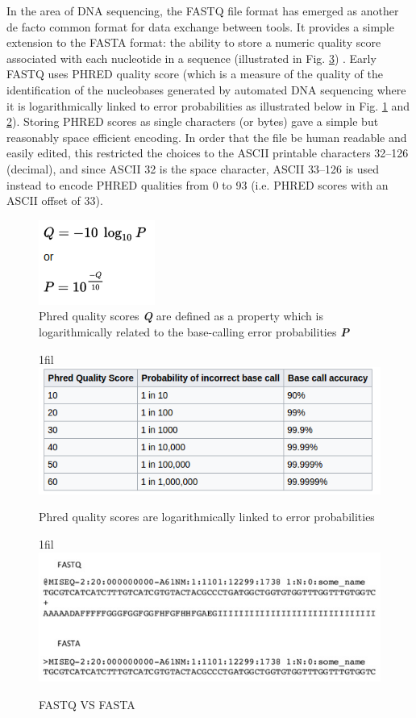 \documentclass[12pt,openany]{llncs}
\makeatletter
\newcommand*{\centerfloat}{%
  \parindent \z@
  \leftskip \z@ \@plus 1fil \@minus \textwidth
  \rightskip\leftskip
  \parfillskip \z@skip}
\makeatother
\begin{document}
In the area of DNA sequencing, the FASTQ file format has emerged as another de facto common format for data exchange between tools. It provides a simple extension to the FASTA format: the ability to store a numeric quality score associated with each nucleotide in a sequence (illustrated in Fig. \ref{fig:fig-NGS-6}) \cite{fasta-fastq2}. 
Early FASTQ uses PHRED quality score \cite{fasta-fastq0} (which is a measure of the quality of the identification of the nucleobases generated by automated DNA sequencing where it is logarithmically linked to error probabilities as illustrated below in Fig. \ref{fig:fig-NGS-3} and \ref{fig:fig-NGS-4}). Storing PHRED scores as single characters (or bytes) gave a simple but reasonably space efficient encoding. In order that the file be human readable and easily edited, this restricted the choices to the ASCII printable characters 32–126 (decimal), and since ASCII 32 is the space character, ASCII 33–126 is used instead to encode PHRED qualities from 0 to 93 (i.e. PHRED scores with an ASCII offset of 33).


\begin{figure}
	\centering
	\includegraphics{./figs/NGS-3}
	\caption{\label{fig:fig-NGS-3}Phred quality scores 
	\textit{\textbf{Q}} are defined as a property which is logarithmically related to the base-calling error probabilities \textit{\textbf{P}}}
\end{figure}
\begin{figure}
	\centerfloat
	\includegraphics[width=1\linewidth]{./figs/NGS-4}
	\caption{\label{fig:fig-NGS-4}Phred quality scores are logarithmically linked to error probabilities}
\end{figure}

\begin{figure}
	\centerfloat
	\includegraphics[width=1\linewidth]{./figs/NGS-6}
	\caption{\label{fig:fig-NGS-6}FASTQ VS FASTA}
\end{figure}
\end{document}
